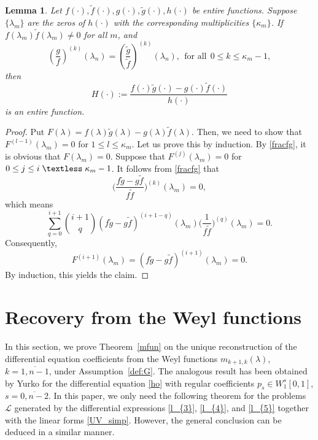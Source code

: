 \documentclass[reqno,12pt,centertags]{amsart}
\numberwithin{equation}{section}
\newtheorem{lemma}[theorem]{Lemma}
\theoremstyle{definition}
\begin{document}
\begin{lemma}\label{entire}
	Let $f(\cdot),\tilde{f}(\cdot),g(\cdot),\tilde{g}(\cdot),h(\cdot)$ be entire functions. Suppose $\{\lambda_m\}$ are the zeros of $h(\cdot)$ with the corresponding multiplicities $\{\kappa_{m}\}$. If $f(\lambda_m)\tilde{f}(\lambda_m)\neq0$ for all $m$, and 
	\begin{equation} \label{fracfg}
	\left(\frac{g}{f}\right)^{(k)}(\lambda_n)=\left(\frac{\tilde{g}}{\tilde{f}}\right)^{(k)}(\lambda_n), \:\: \text{for all} \:\: 0\leq k\leq \kappa_{m}-1, 
	\end{equation}
	then 
	$$
	H(\cdot):=\frac{f(\cdot)\tilde{g}(\cdot)-g(\cdot)\tilde{f}(\cdot)}{h(\cdot)}
	$$ 
	is an entire function.
\end{lemma}	
\begin{proof}
	Put $F(\lambda)=f(\lambda)\tilde{g}(\lambda)-g(\lambda)\tilde{f}(\lambda)$.
	Then, we need to show that $F^{(l-1)}(\lambda_m)=0$ for $1\leq l\leq \kappa_{m}$.
	Let us prove this by induction. By \eqref{fracfg}, it is obvious that $F(\lambda_m) = 0$. Suppose that $F^{(j)}(\lambda_m)=0$ for $0\leq j\leq i\;\textless \;\kappa_{m}-1$. It follows from \eqref{fracfg} that
	 $$
	 \bigg(\frac{f\tilde{g}-g\tilde{f}}{f\tilde{f}}\bigg)^{(k)}(\lambda_m)=0, 
	 $$ which means  $$\sum_{q=0}^{i+1}\binom{i+1}{q}(f\tilde{g}-g\tilde{f})^{(i+1-q)}(\lambda_m)\bigg(\frac{1}{f\tilde{f}}\bigg)^{(q)}(\lambda_m)=0.$$
	Consequently, 
	$$
	F^{(i+1)}(\lambda_m) = (f\tilde{g}-g\tilde{f})^{(i+1)}(\lambda_m)=0.
	$$
	By induction, this yields the claim.
\end{proof}


\section{Recovery from the Weyl functions} \label{sec:Weyl}

In this section, we prove Theorem~\ref{mfun} on the unique reconstruction of the differential equation coefficients from the Weyl functions $m_{k+1,k}(\lambda)$, $k = \overline{1,n-1}$, under Assumption~\ref{def:G}. The analogous result has been obtained by Yurko \cite{Yur} for the differential equation \eqref{ho} with regular coefficients $p_s \in W_1^s[0,1]$, $s = \overline{0,n-2}$. In this paper, we only need the following theorem for the problems $\mathcal L$ generated by the differential expressions \eqref{l_{3}}, \eqref{l_{4}}, and \eqref{l_{5}} together with the linear forms \eqref{UV_simp}.
However, the general conclusion can be deduced in a similar manner. 
\end{document}
